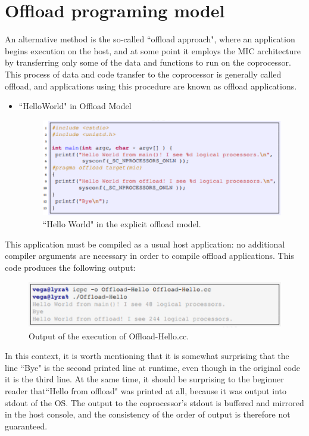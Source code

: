 \documentclass[12pt]{article}
\begin{document}
\section{Offload programing model}
An alternative method is the so-called ``offload approach", where an application begins execution on the host, and at some point it employs the MIC architecture by transferring only some of the data and functions to run on the coprocessor. This process of data and code transfer to the coprocessor is generally called offload, and applications using this procedure are known as offload applications.
\begin{itemize}
\item ``HelloWorld" in Offload Model
\begin{figure}[H]
\centering
\includegraphics[scale = 0.9]{chainer7.png}
\caption{``Hello World" in the explicit offload model.}
\end{figure}
\end{itemize}

This application must be compiled as a usual host application:  no additional compiler arguments are necessary in order to compile offload applications. This code produces the following output:
\begin{figure}[H]
\centering
\includegraphics[scale = 0.9]{chainer8.png}
\caption{Output of the execution of Offload-Hello.cc.}
\end{figure}
In this context, it is worth mentioning that it is somewhat surprising that the line ``Bye" is the second printed line at runtime, even though in the original code it is the third line. At the same time, it should be surprising to the beginner reader that``Hello from offload" was printed at all, because it was output into stdout of the OS. The output to the coprocessor's stdout is buffered and mirrored in the host console, and the consistency of the order of output is therefore not guaranteed.
\end{document}
